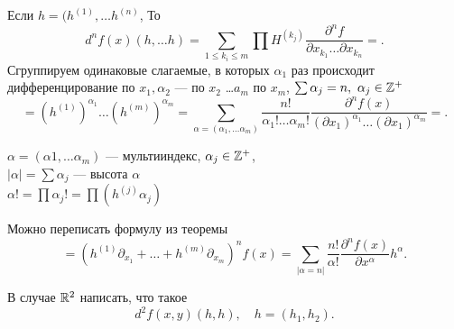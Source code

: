 \documentclass[11pt,dvipsnames]{report}
\begin{document}
\begin{thm}[еще более частный случай, $ X = \R^{m} , Y = \R, h_i = h_j$ ]
    Если $ h = (h^{(1)}, \ldots h^{(n)}$, То
    \[
	d^{n}f(x) (h, \ldots h) = \sum_{1 \le k_i \le m} \prod H^{(k_j)} \frac{\partial ^{n } f}{\partial x_{k_1} \ldots \partial x_{k_n}} = 
    .\] 
    Сгруппируем одинаковые слагаемые, в которых $ \alpha _1$ раз происходит дифференцирование по $ x_1, \alpha _2$ --- по $ x_2$  \ldots $ a_m$ по  $ x_m$, $ \sum \alpha _j = n, ~ \alpha _j \in \mathbb{Z}^{+} $ 
    \[
=(h^{(1)})^{\alpha _1} \ldots (h^{(m)})^{\alpha _m} 
=\sum_{\alpha = (\alpha _1, \ldots \alpha _m)} \frac{n!}{\alpha _1! \ldots \alpha _m!} \frac{\partial ^{n}f(x)}{(\partial x_1)^{\alpha _1} \ldots (\partial x_1)^{\alpha _m}}=
    .\] 
\end{thm}
\begin{name}
    $ $
    \\
    $ \alpha  = (\alpha 1, \ldots \alpha _m)$ ---  мультииндекс, $ \alpha _j \in  \mathbb{Z}^{+}$,\\
    $ \left| \alpha  \right| = \sum \alpha _j $ --- высота  $ \alpha $\\
    $ \alpha !  = \prod \alpha _j ! = \prod (h^{(j)}{\alpha _j})$

\end{name}
Можно переписать формулу из теоремы
\[
    = \left(h^{(1)} \partial _{x_1} + \ldots + h^{(m)} \partial _{x_m}\right)^{n } f(x) = \sum_{\lvert \alpha = n \rvert }^{} \frac{n! }{\alpha !} \frac{\partial ^{n} f(x)}{\partial x^{\alpha }} h^{\alpha }
.\] 
\begin{prac}
    В случае $ \mathbb{R}^2$ написать, что такое
    \[
	d^2f(x, y)(h, h) , \quad h = (h_1, h_2)
    .\] 
\end{prac}
\end{document}
